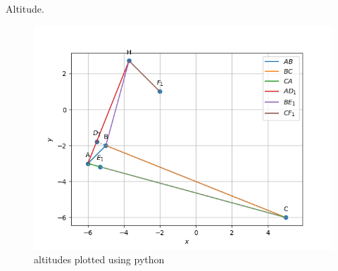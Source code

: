 \begin{table}[H]
        \centering
        
        \caption{Altitude.}
        \label{tab:Altitude}
    \end{table}
\begin{figure}[H]
\includegraphics[width=\columnwidth]{1.3/figs/13.png}
\caption{altitudes plotted using python}
\label{fig:i_altitude_py}
\end{figure}
